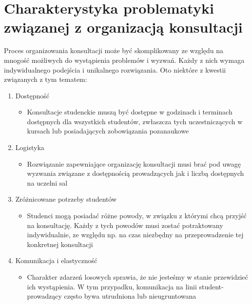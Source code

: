 \section{Charakterystyka problematyki związanej z organizacją konsultacji}
Proces organizowania konsultacji może być skomplikowany ze względu na mnogość możliwych do wystąpienia problemów i wyzwań. Każdy z nich wymaga indywidualnego podejścia i unikalnego rozwiązania. Oto niektóre z kwestii związanych z tym tematem:
\begin{enumerate}
    \item Dostępność
        \begin{itemize}
            \item[] Konsultacje studenckie muszą być dostępne w godzinach i terminach dostępnych dla wszystkich studentów, zwłaszcza tych uczestniczących w kursach lub posiadających zobowiązania pozanaukowe
        \end{itemize}
    \item Logistyka
        \begin{itemize}
            \item[] Rozwiązanie zapewniające organizację konsultacji musi brać pod uwagę wyzwania związane z dostępnością prowadzących jak i liczbą dostępnych na uczelni sal
        \end{itemize}
    \item Zróżnicowane potrzeby studentów
        \begin{itemize}
            \item[] Studenci mogą posiadać różne powody, w związku z którymi chcą przyjść na konsultację. Każdy z tych powodów musi zostać potraktowany indywidualnie, ze względu np. na czas niezbędny na przeprowadzenie tej konkretnej konsultacji 
        \end{itemize}
    \newpage
    \item Komunikacja i elastyczność
        \begin{itemize}
            \item[] Charakter zdarzeń losowych sprawia, że nie jesteśmy w stanie przewidzieć ich wystąpienia. W tym przypadku, komunikacja na linii student-prowadzący często bywa utrudniona lub nieugruntowana
        \end{itemize}
\end{enumerate}
